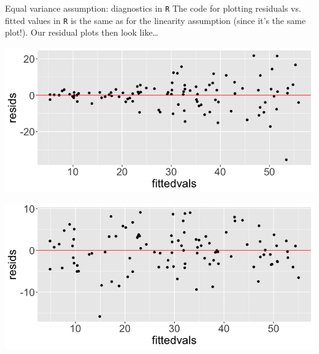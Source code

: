 \documentclass[10pt,t]{beamer}
\begin{document}
\begin{frame}{Equal variance assumption: diagnostics in \texttt{R}}
The code for plotting residuals vs. fitted values in \texttt{R} is the same as for the linearity assumption (since it's the same plot!). Our residual plots then look like\dots

\centering

\includegraphics[scale=0.2]{eqvar_resids1.png}

\includegraphics[scale=0.2]{eqvar_resids2.png}

\end{frame}
\end{document}

